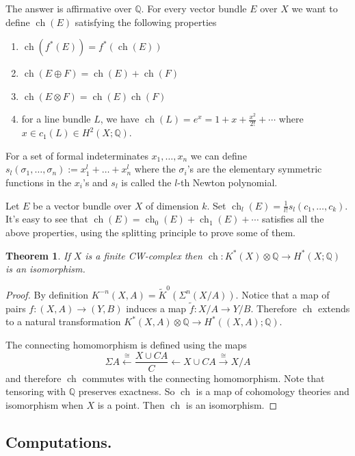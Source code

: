 \documentclass[a4paper,10pt]{article}
\theoremstyle{plain}%
\newtheorem{thm}{Theorem}
\theoremstyle{definition}
\theoremstyle{remark}
\newcommand{\QQ}{\mathbb{Q}}
\DeclareMathOperator{\ch}{ch}
\newcommand{\xto}[1]{\xrightarrow{#1}}
\newcommand{\xot}[1]{\xleftarrow{#1}}
\begin{document}

The answer is affirmative over $\QQ$. For every vector bundle $E$ over $X$ we want to define $\ch(E)$ %
satisfying the following properties
\begin{enumerate}
\item $\ch(f^*(E))=f^*(\ch(E))$
\item $\ch(E\oplus F) =  \ch(E) + \ch(F)$
\item $\ch(E\otimes F) = \ch(E)\ch(F)$
\item for a line bundle $L$, we have $\ch(L) = e^x = 1+x+\frac{x^2}{2!}+\cdots$ where $x\in c_1(L)\in H^2(X;\QQ).$
\end{enumerate}

For a set of formal indeterminates $x_1,\ldots, x_n$ we can define $s_l(\sigma_1,\ldots,\sigma_n):= x_1^l + \ldots +x_n^l$ where the $\sigma_i$'s are the elementary symmetric functions in the $x_i$'s and $s_l$ is called the $l$-th Newton polynomial.

Let $E$ be a vector bundle over $X$ of dimension $k$. Set $\ch_l(E)=\frac{1}{l!}s_l(c_1,\ldots,c_k)$. It's easy to see that $\ch(E) = \ch_0(E) + \ch_1(E) + \cdots$ satisfies all the above properties, using the splitting principle to prove some of them.

\begin{thm}
If $X$ is a finite CW-complex then $\ch:K^*(X)\otimes \QQ \to H^*(X;\QQ)$ is an isomorphism.
\end{thm}

\begin{proof}
By definition $K^{-n}(X,A) = \tilde{K}^0(\Sigma^n(X/A))$. Notice that a map of pairs $f:(X,A)\to (Y,B)$ induces a map $\tilde{f}:X/A\to Y/B$. Therefore $\ch$ extends to a natural transformation $K^*(X,A)\otimes\QQ\to H^*((X,A);\QQ)$.

The connecting homomorphism is defined using the maps
\[
\Sigma A \xot{\cong} \frac{X\cup CA}{C} \longleftarrow X\cup CA \xto{\cong} X/A
\]
and therefore $\ch$ commutes with the connecting homomorphism. Note that tensoring with $\QQ$ preserves exactness. So $\ch$ is a map of cohomology theories and isomorphism when $X$ is a point. Then $\ch$ is an isomorphism.
\end{proof}

\subsection{Computations.}
\end{document}
